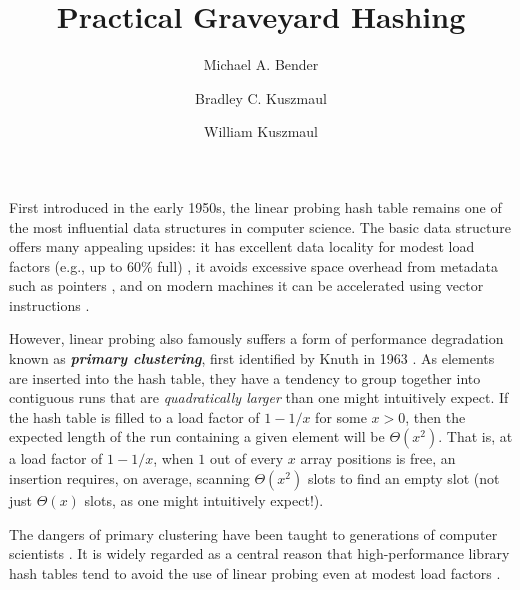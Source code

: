\documentclass[10pt]{article}
\title{Practical Graveyard Hashing}
\author{Michael A. Bender \and
        Bradley C. Kuszmaul \and
        William Kuszmaul}
\theoremstyle{remark}
\theoremstyle{remark}
\newcommand{\defn}[1]{\textbf{\emph{#1}}}
\renewcommand{\paragraph}[1]{\vspace{.2 cm} \noindent \textbf{#1}}
\newcommand{\propose}[1]{{\color{navyblue}#1}}
\begin{document}
\maketitle



First introduced in the early 1950s, the linear probing hash table remains one of the most influential data structures in computer science. The basic data structure offers many appealing upsides: it has excellent data locality for modest load factors (e.g., up to 60\% full)
\cite{...}, it avoids excessive space overhead from metadata such as pointers \cite{..}, and on modern machines it can be accelerated 
 using vector instructions \cite{xxxx}.
 


However, linear probing also famously suffers a form of performance degradation known as \defn{primary clustering}, first identified by Knuth in 1963 \cite{...}. As elements are inserted into the hash table, they have a tendency to group together into contiguous runs that are \emph{quadratically larger} than one might intuitively expect. If the hash table is filled to a load factor of $1 - 1 / x$ for some $x > 0$, then the expected length of the run containing a given element will be $\Theta(x^2)$. 
That is, at a load factor of $1-1/x$, when $1$ out of every  $x$ array positions is free, an insertion requires, on average, scanning $\Theta(x^2)$ slots to find an empty slot (not just $\Theta(x)$ slots, as one might intuitively expect!).

The dangers of primary clustering have been taught to generations of computer scientists \cite{...}. It is widely regarded as a central reason that high-performance library hash tables tend to avoid the use of linear probing even at modest load factors \cite{...}.

\end{document}
